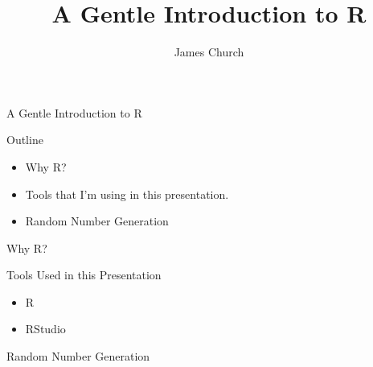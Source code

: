 \documentclass{beamer}
\author{James Church}
\title{A Gentle Introduction to R}
\begin{document}
\begin{frame}[plain] \titlepage \end{frame}

\begin{frame}{A Gentle Introduction to R}

    Outline

    \begin{itemize}
        \item Why R?
        \item Tools that I'm using in this presentation.
        \item Random Number Generation
    \end{itemize}

\end{frame}

\begin{frame}{Why R?}
\end{frame}

\begin{frame}{Tools Used in this Presentation}
    \begin{itemize}
        \item R
        \item RStudio
    \end{itemize}
\end{frame}

\begin{frame}{Random Number Generation}
\end{frame}
\end{document}
